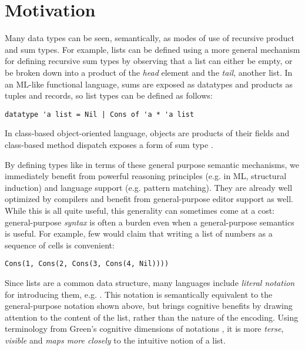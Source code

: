 \section{Motivation}
\label{s:intro}
Many data types can be seen, semantically, as modes of use of recursive product and sum types. 
For example, lists can be defined using a more general mechanism for defining recursive sum types by observing that a list can either be empty, or be broken down into a product of the \emph{head} element and the \emph{tail}, another list. In an ML-like functional language, sums are exposed as datatypes and products as tuples and records, so list types can be defined as follows:
\begin{lstlisting}[numbers=none]
datatype 'a list = Nil | Cons of 'a * 'a list
\end{lstlisting}
In class-based object-oriented language, objects are products of their fields and class-based method dispatch exposes a form of sum type \cite{pfpl}. 

By defining types like  in terms of these general purpose semantic mechanisms, we immediately benefit from powerful reasoning principles (e.g. in ML, structural induction) and language support (e.g.  pattern matching). They are already well optimized by compilers and benefit from general-purpose editor support as well. %
While this is all quite useful, this generality can sometimes come at a cost: general-purpose \emph{syntax} is often a burden even when a general-purpose semantics is useful. For example, few would claim that writing a list of numbers as a sequence of  cells is convenient:
\begin{lstlisting}[numbers=none]
Cons(1, Cons(2, Cons(3, Cons(4, Nil))))
\end{lstlisting}

Since lists are a common data structure, many languages include \emph{literal notation} for introducing them, e.g. \li{[1, 2, 3, 4]}. This notation is semantically equivalent to the general-purpose notation shown above, but brings cognitive benefits by drawing attention to the content of the list, rather than the nature of the encoding. Using terminology from Green's cognitive dimensions of notations \cite{green1996usability}, it is more \emph{terse}, \emph{visible} and \emph{maps more closely} to the intuitive notion of a list.

